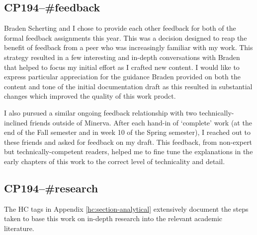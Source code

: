 \documentclass[../main.tex]{subfiles}
\begin{document}
\subsection*{\textbf{CP194--\#feedback}}

Braden Scherting and I chose to provide each other feedback for both of the formal feedback assignments this year. This was a decision designed to reap the benefit of feedback from a peer who was increasingly familiar with my work. This strategy resulted in a few interesting and in-depth conversations with Braden that helped to focus my initial effort as I crafted new content. I would like to express particular appreciation for the guidance Braden provided on both the content and tone of the initial documentation draft as this resulted in substantial changes which improved the quality of this work prodct.

\vspace{\baselineskip}

I also pursued a similar ongoing feedback relationship with two technically-inclined friends outside of Minerva. After each hand-in of `complete' work (at the end of the Fall semester and in week 10 of the Spring semester), I reached out to these friends and asked for feedback on my draft. This feedback, from non-expert but technically-competent readers, helped me to fine tune the explanations in the early chapters of this work to the correct level of technicality and detail.

\subsection*{\textbf{CP194--\#research}}

The HC tags in Appendix \ref{hc:section-analytical} extensively document the steps taken to base this work on in-depth research into the relevant academic literature.

\end{document}
